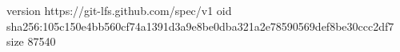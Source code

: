 version https://git-lfs.github.com/spec/v1
oid sha256:105c150e4bb560cf74a1391d3a9e8be0dba321a2e78590569def8be30ccc2df7
size 87540
